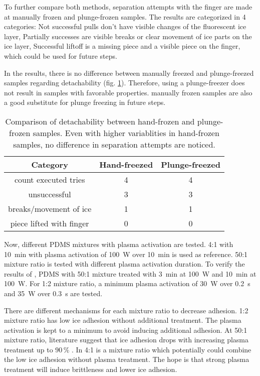 To further compare both methods, separation attempts with the finger are made at manually frozen and plunge-frozen samples. The results are categorized in 4 categories: Not successful pulls don't have visible changes of the fluorescent ice layer, Partially successes are visible breaks or clear movement of ice parts on the ice layer, Successful liftoff is a missing piece and a visible piece on the finger, which could be used for future steps.

In the results, there is no difference between manually freezed and plunge-freezed samples regarding detachability (fig. \ref{table:AttemptsHandsvsMachine}). Therefore, using a plunge-freezer does not result in samples with favorable properties. manually frozen samples are also a good substitute for plunge freezing in future steps.

\begin{table}
	\centering
	\begin{tabular}{|c|c|c|}
		\hline
		Category & Hand-freezed & Plunge-freezed \\
		\hline
		\hline
		count executed tries & 4 & 4\\
		\hline
		unsuccessful & 3 & 3\\
		\hline
		breaks/movement of ice & 1 & 1\\
		\hline
		piece lifted with finger & 0 & 0\\
		\hline		
	\end{tabular}
	\caption{Comparison of detachability between hand-frozen and plunge-frozen samples. Even with higher variablities in hand-frozen samples, no difference in separation attempts are noticed.}
	\label{table:AttemptsHandsvsMachine}
\end{table}

Now, different PDMS mixtures with plasma activation are tested. 4:1 with \SI{10}{\minute} with plasma activation of \SI{100}{\watt} over \SI{10}{\minute} is used as reference. 50:1 mixture ratio is tested with different plasma activation duration. To verify the results of \cite{Ohishi.2017}, PDMS with 50:1 mixture treated with \SI{3}{\minute} at \SI{100}{\watt} and \SI{10}{\minute} at \SI{100}{\watt}. For 1:2 mixture ratio, a minimum plasma activation of \SI{30}{\watt} over \SI{0.2}{\second} and \SI{35}{\watt} over \SI{0.3}{\second} are tested.

There are different mechanisms for each mixture ratio to decrease adhesion. 1:2 mixture ratio has low ice adhesion without additional treatment. The plasma activation is kept to a minimum to avoid inducing additional adhesion. At 50:1 mixture ratio, literature suggest that ice adhesion drops with increasing plasma treatment up to $90\,\%$ \cite{Ohishi.2017}. In 4:1 is a mixture ratio which potentially could combine the low ice adhesion without plasma treatment. The hope is that strong plasma treatment will induce brittleness and lower ice adhesion.

